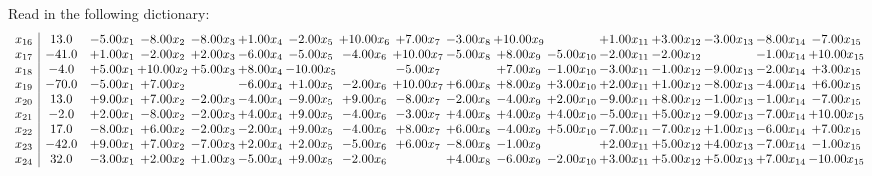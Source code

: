 \documentclass[9pt]{article}
\begin{document}
Read in the following dictionary:
\[\begin{array}{c| c c@{\hskip 2pt} c@{\hskip 2pt} c@{\hskip 2pt} c@{\hskip 2pt} c@{\hskip 2pt} c@{\hskip 2pt} c@{\hskip 2pt} c@{\hskip 2pt} c@{\hskip 2pt} c@{\hskip 2pt} c@{\hskip 2pt} c@{\hskip 2pt} c@{\hskip 2pt} c@{\hskip 2pt} c@{\hskip 2pt} }
 x_{16}   &  13.0 & -5.00 x_{1} & -8.00 x_{2} & -8.00 x_{3} & +  1.00 x_{4} & -2.00 x_{5} & + 10.00 x_{6} & +  7.00 x_{7} & -3.00 x_{8} & + 10.00 x_{9} &   & +  1.00 x_{11} & +  3.00 x_{12} & -3.00 x_{13} & -8.00 x_{14} & -7.00 x_{15}\\
 x_{17}   &  -41.0 & +  1.00 x_{1} & -2.00 x_{2} & +  2.00 x_{3} & -6.00 x_{4} & -5.00 x_{5} & -4.00 x_{6} & + 10.00 x_{7} & -5.00 x_{8} & +  8.00 x_{9} & -5.00 x_{10} & -2.00 x_{11} & -2.00 x_{12} &   & -1.00 x_{14} & + 10.00 x_{15}\\
 x_{18}   &  -4.0 & +  5.00 x_{1} & + 10.00 x_{2} & +  5.00 x_{3} & +  8.00 x_{4} & -10.00 x_{5} &   & -5.00 x_{7} &   & +  7.00 x_{9} & -1.00 x_{10} & -3.00 x_{11} & -1.00 x_{12} & -9.00 x_{13} & -2.00 x_{14} & +  3.00 x_{15}\\
 x_{19}   &  -70.0 & -5.00 x_{1} & +  7.00 x_{2} &   & -6.00 x_{4} & +  1.00 x_{5} & -2.00 x_{6} & + 10.00 x_{7} & +  6.00 x_{8} & +  8.00 x_{9} & +  3.00 x_{10} & +  2.00 x_{11} & +  1.00 x_{12} & -8.00 x_{13} & -4.00 x_{14} & +  6.00 x_{15}\\
 x_{20}   &  13.0 & +  9.00 x_{1} & +  7.00 x_{2} & -2.00 x_{3} & -4.00 x_{4} & -9.00 x_{5} & +  9.00 x_{6} & -8.00 x_{7} & -2.00 x_{8} & -4.00 x_{9} & +  2.00 x_{10} & -9.00 x_{11} & +  8.00 x_{12} & -1.00 x_{13} & -1.00 x_{14} & -7.00 x_{15}\\
 x_{21}   &  -2.0 & +  2.00 x_{1} & -8.00 x_{2} & -2.00 x_{3} & +  4.00 x_{4} & +  9.00 x_{5} & -4.00 x_{6} & -3.00 x_{7} & +  4.00 x_{8} & +  4.00 x_{9} & +  4.00 x_{10} & -5.00 x_{11} & +  5.00 x_{12} & -9.00 x_{13} & -7.00 x_{14} & + 10.00 x_{15}\\
 x_{22}   &  17.0 & -8.00 x_{1} & +  6.00 x_{2} & -2.00 x_{3} & -2.00 x_{4} & +  9.00 x_{5} & -4.00 x_{6} & +  8.00 x_{7} & +  6.00 x_{8} & -4.00 x_{9} & +  5.00 x_{10} & -7.00 x_{11} & -7.00 x_{12} & +  1.00 x_{13} & -6.00 x_{14} & +  7.00 x_{15}\\
 x_{23}   &  -42.0 & +  9.00 x_{1} & +  7.00 x_{2} & -7.00 x_{3} & +  2.00 x_{4} & +  2.00 x_{5} & -5.00 x_{6} & +  6.00 x_{7} & -8.00 x_{8} & -1.00 x_{9} &   & +  2.00 x_{11} & +  5.00 x_{12} & +  4.00 x_{13} & -7.00 x_{14} & -1.00 x_{15}\\
 x_{24}   &  32.0 & -3.00 x_{1} & +  2.00 x_{2} & +  1.00 x_{3} & -5.00 x_{4} & +  9.00 x_{5} & -2.00 x_{6} &   & +  4.00 x_{8} & -6.00 x_{9} & -2.00 x_{10} & +  3.00 x_{11} & +  5.00 x_{12} & +  5.00 x_{13} & +  7.00 x_{14} & -10.00 x_{15}\\

\end{array}\]
\end{document}
